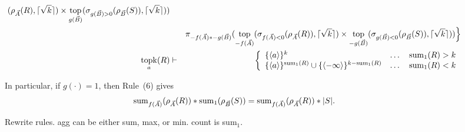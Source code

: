 \begin{figure*}
\begin{eqnarray}
(\rho_{\vec{A}}(R),
\lceil \sqrt{k} \rceil) \times
\mathop{\mathrm{top}}_{g(\vec{B})}
(\sigma_{g(\vec{B}) > 0}(\rho_{\vec{B}}(S)),
\lceil \sqrt{k} \rceil))
\nonumber\\
& &
\pi_{-f(\vec{A}) * -g(\vec{B})}(
\mathop{\mathrm{top}}_{-f(\vec{A})}
(\sigma_{f(\vec{A}) < 0}(\rho_{\vec{A}}(R)),
\lceil \sqrt{k} \rceil) \times
\mathop{\mathrm{top}}_{-g(\vec{B})}
(\sigma_{g(\vec{B}) < 0}(\rho_{\vec{B}}(S)),
\lceil \sqrt{k} \rceil))
\Big\}
\label{r17}
\\
\mathop{\mathrm{topk}}_{a}(R)
&\vdash&
\left\{\begin{array}{lll}
\{{\langle a\rangle}\}^k & \dots & \mathrm{sum}_{1}(R) > k\\
\{{\langle a\rangle}\}^{\mathrm{sum}_{1}(R)} \cup \{{\langle-\infty\rangle}\}^{k-\mathrm{sum}_{1}(R)}
& \dots & \mathrm{sum}_{1}(R) < k
\end{array}\right.
\label{r18}
\end{eqnarray}

In particular, if $g(\cdot) = 1$, then Rule~(6) gives
\[
\mathrm{sum}_{f(\vec{A})}(\rho_{\vec{A}}(R)) *
\mathrm{sum}_{1}(\rho_{\vec{B}}(S))
=
\mathrm{sum}_{f(\vec{A})}(\rho_{\vec{A}}(R)) * |S|.
\]

\caption{Rewrite rules. agg can be either sum, max, or min.
count is sum$_1$.}
\label{fig:rules}
\end{figure*}


